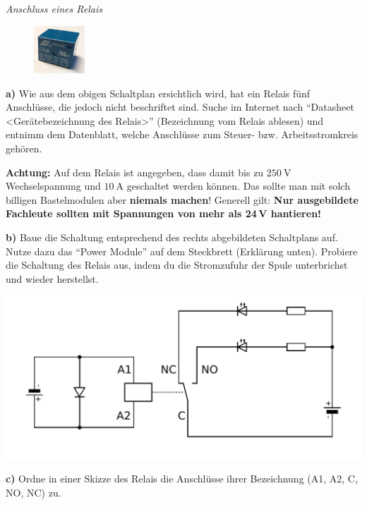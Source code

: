 \begin{aufgabe}\emph{Anschluss eines Relais}
	
	\begin{figure}
		\vspace{-\baselineskip}
		\centering
		\includegraphics[width=0.17\textwidth]{./pics/relais-klein.png}
	\end{figure}
	\textbf{a)} Wie aus dem obigen Schaltplan ersichtlich wird, hat ein Relais fünf Anschlüsse, die jedoch nicht beschriftet sind. Suche im Internet nach \enquote{Datasheet <Gerätebezeichnung des Relais>} (Bezeichnung vom Relais ablesen) und entnimm dem Datenblatt, welche Anschlüsse zum Steuer- bzw. Arbeitsstromkreis gehören.
	
	\medskip
	\ausrufezeichen \textbf{Achtung:} Auf dem Relais ist angegeben, dass damit bis zu $\SI{250}{\volt}$ Wechselspannung und $\SI{10}{\ampere}$ geschaltet werden können. Das sollte man mit solch billigen Bastelmodulen aber \textbf{niemals machen}! Generell gilt: \textbf{Nur ausgebildete Fachleute sollten mit Spannungen von mehr als 24\,V hantieren!}
	
	\bigskip
	\begin{minipage}{0.44\textwidth}
		\textbf{b)} Baue die Schaltung entsprechend des rechts abgebildeten Schaltplans auf. Nutze dazu das \enquote{Power Module} auf dem Steckbrett (Erklärung unten). Probiere die Schaltung des Relais aus, indem du die Stromzufuhr der Spule unterbrichst und wieder herstellst.
	\end{minipage}
	\hfill
	\begin{minipage}{0.54\textwidth}
		\centering
		\includegraphics[width=\textwidth]{./Zeichnungen/relais-schaltung-ohne-arduino.png}
	\end{minipage}
	
	\medskip
	\textbf{c)} Ordne in einer Skizze des Relais die Anschlüsse ihrer Bezeichnung (A1, A2, C, NO, NC) zu.
\end{aufgabe}

